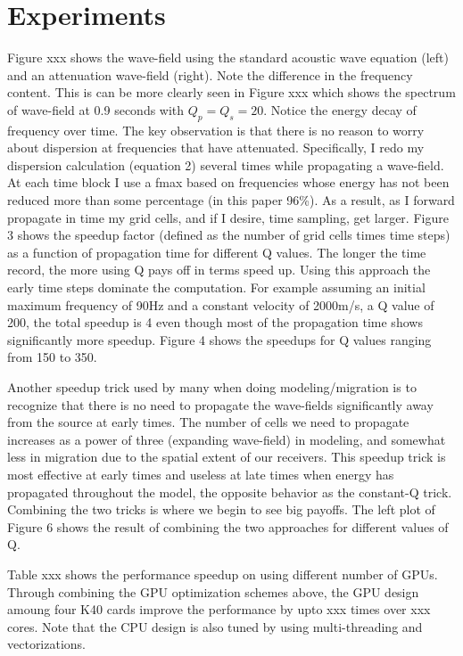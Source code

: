 \documentclass{paris17}
\begin{document}
\section{Experiments}

Figure xxx shows the wave-field using the standard acoustic wave equation (left) and an attenuation wave-field (right). Note the difference in the frequency content. This is can be more clearly seen in Figure xxx which shows the spectrum of wave-field at 0.9 seconds with $Q_p = Q_s = 20$. Notice the energy decay of frequency over time. The key observation is that there is no reason to worry about dispersion at frequencies that have attenuated. Specifically, I redo my dispersion calculation (equation 2) several times while propagating a wave-field. At each time block I use a fmax based on frequencies whose energy has not been reduced more than some percentage (in this paper 96\%). As a result, as I forward propagate in time my grid cells, and if I desire, time sampling, get larger. Figure 3 shows the speedup factor (defined as the number of grid cells times time steps) as a function of propagation time for different Q values. The longer the time record, the more using Q pays off in terms speed up. Using this approach the early time steps dominate the computation. For example assuming an initial maximum frequency of 90Hz and a constant velocity of 2000m/s, a Q value of 200, the total speedup is 4 even though most of the propagation time shows significantly more speedup. Figure 4 shows the speedups for Q values ranging from 150 to 350.

Another speedup trick used by many when doing modeling/migration is to recognize that there is no need to propagate the wave-fields significantly away from the source at early times. The number of cells we need to propagate increases as a power of three (expanding wave-field) in modeling, and somewhat less in migration due to the spatial extent of our receivers. This speedup trick is most effective at early times and useless at late times when energy has propagated throughout the model, the opposite behavior as the constant-Q trick. Combining the two tricks is where we begin to see big payoffs. The left plot of Figure 6 shows the result of combining the two approaches for different values of Q.

Table xxx shows the performance speedup on using different number of GPUs. Through combining the GPU optimization schemes above, the GPU design amoung four K40 cards improve the performance by upto xxx times over xxx cores. Note that the CPU design is also tuned by using multi-threading and vectorizations.
\end{document}
